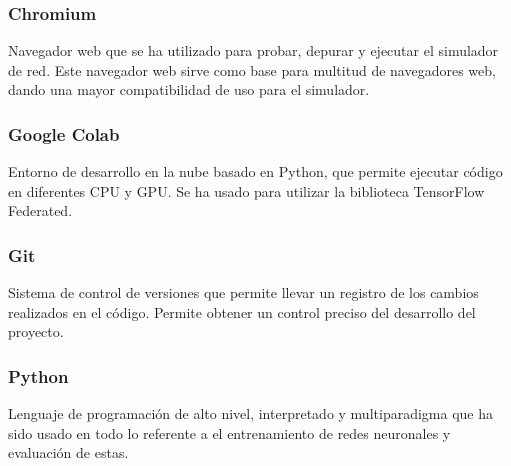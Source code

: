 \subsubsection{Chromium}
\label{subsubsec:Chromium}
Navegador web que se ha utilizado para probar, depurar y ejecutar el simulador de red. Este navegador web sirve como base para multitud de navegadores web, dando una mayor compatibilidad de uso para el simulador. 

\subsubsection{Google Colab}
\label{subsubsec:Colab}
Entorno de desarrollo en la nube basado en Python, que permite ejecutar código en diferentes CPU y GPU. Se ha usado para utilizar la biblioteca TensorFlow Federated.

\subsubsection{Git}
\label{subsubsec:Git}
Sistema de control de versiones que permite llevar un registro de los cambios realizados en el código. Permite obtener un control preciso del desarrollo del proyecto. 

\subsubsection{Python}
\label{subsubsec:Python}
Lenguaje de programación de alto nivel, interpretado y multiparadigma que ha sido usado en todo lo referente a el entrenamiento de redes neuronales y evaluación de estas.

